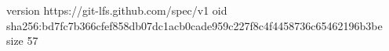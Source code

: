 version https://git-lfs.github.com/spec/v1
oid sha256:bd7fc7b366cfef858db07dc1acb0cade959c227f8c4f4458736c65462196b3be
size 57
